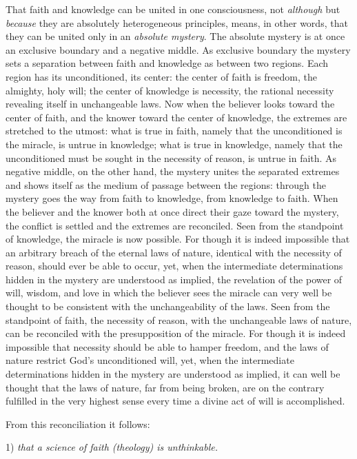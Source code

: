 \documentclass[12pt]{book}
\newcommand{\opage}[1]{\marginnote{\footnotesize\textit{[#1]}}}
\begin{document}
That faith and knowledge can be united in one consciousness, not \emph{although} but \emph{because} they are absolutely heterogeneous principles, means, in other words, that they can be united only in an \emph{absolute mystery}. The absolute mystery is at once an exclusive boundary and a negative middle. As exclusive boundary the mystery sets a separation between faith and knowledge as between two regions. Each region has its unconditioned, its center: the center of faith is freedom, the almighty, holy will; the center of knowledge is necessity, the rational necessity revealing itself in unchangeable laws. Now when the believer looks toward the center of faith, and the knower toward the center of knowledge, the extremes are stretched to the utmost: what is true in faith, namely that the unconditioned is the miracle, is untrue in knowledge; what is true in knowledge, namely that the unconditioned must be sought in the necessity of reason, is untrue in faith. As negative middle, on the other hand, the mystery unites the separated extremes and shows itself as the medium of passage between the regions: through the mystery goes the way from faith to knowledge, from knowledge to faith. When the believer and the knower both at once direct their gaze toward the mystery, the conflict is settled and the extremes are reconciled. Seen from the standpoint of knowledge, the miracle is now possible. For though it is indeed impossible that an arbitrary breach of the eternal laws of nature, identical with the necessity of reason, should ever be able to occur, yet, when the intermediate determinations hidden in the mystery are understood as implied, the revelation of the power of will, wisdom, and love in which the believer sees the miracle can very well be thought to be consistent with the unchangeability of the laws. Seen from the standpoint of faith, the necessity of reason, with the unchangeable laws of nature, can be reconciled with the presupposition of the miracle. For though it is indeed
\opage{34}\setcounter{footnote}{0}%
impossible that necessity should be able to hamper freedom, and the laws of nature restrict God's unconditioned will, yet, when the intermediate determinations hidden in the mystery are understood as implied, it can well be thought that the laws of nature, far from being broken, are on the contrary fulfilled in the very highest sense every time a divine act of will is accomplished.

From this reconciliation it follows:

1) \emph{that a science of faith (theology) is unthinkable.}
\end{document}
